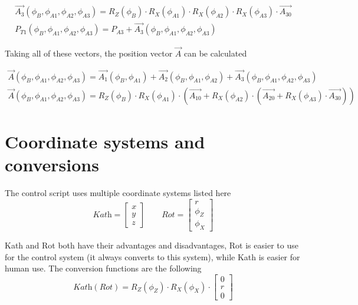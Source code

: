 \documentclass{article}
\newcommand{\vect}[1]{\left[\begin{array}{c}#1\end{array}\right]}
\begin{document}
        \begin{equation}
            \begin{array}{cc}
                \vec{A_3}(\phi_B, \phi_{A1}, \phi_{A2}, \phi_{A3}) = R_Z(\phi_B) \cdot R_X(\phi_{A1}) \cdot R_X(\phi_{A2}) \cdot R_X(\phi_{A3}) \cdot \vec{A_{30}} \\
                P_{T1}(\phi_B, \phi_{A1}, \phi_{A2}, \phi_{A3}) = P_{A3} + \vec{A_3}(\phi_B, \phi_{A1}, \phi_{A2}, \phi_{A3})
            \end{array}
        \end{equation}
    
    Taking all of these vectors, the position vector $\vec{A}$ can be calculated 
        
        \begin{equation}
            \begin{array}{cc}
                \vec{A}(\phi_B, \phi_{A1}, \phi_{A2}, \phi_{A3}) = \vec{A_1}(\phi_B, \phi_{A1}) + \vec{A_2}(\phi_B, \phi_{A1}, \phi_{A2}) + \vec{A_3}(\phi_B, \phi_{A1}, \phi_{A2}, \phi_{A3}) \\
                
                \vec{A}(\phi_B, \phi_{A1}, \phi_{A2}, \phi_{A3}) = R_Z(\phi_B) \cdot R_X(\phi_{A1}) \cdot \left( \vec{A_{10}}  + R_X(\phi_{A2}) \cdot \left( \vec{A_{20}}  + R_X(\phi_{A3}) \cdot \vec{A_{30}} \right) \right)
            \end{array}
        \end{equation} 
    
    \clearpage
    
\section{Coordinate systems and conversions}
    The control script uses multiple coordinate systems listed here
    \begin{equation}
        \textit{Kath} = \vect{x \\ y \\ z} \qquad \textit{Rot} = \vect{r \\ \phi_Z \\ \phi_X }
    \end{equation}
    
    Kath and Rot both have their advantages and disadvantages, Rot is easier to use for the control system (it always converts to this system), while Kath is easier for human use. The conversion functions are the following
    \begin{equation}
        \textit{Kath}(\textit{Rot}) = R_Z(\phi_Z) \cdot R_X(\phi_X) \cdot \vect{0 \\ r \\ 0}
    \end{equation}
    
\end{document}
